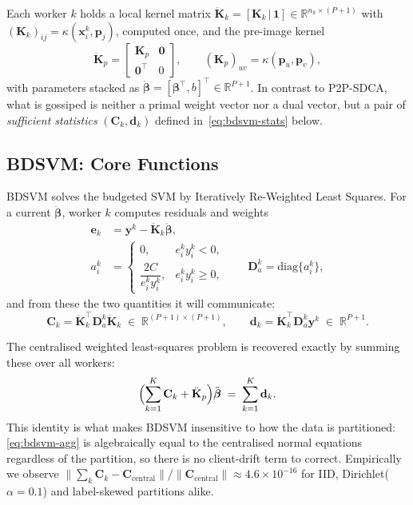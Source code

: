 Each worker $k$ holds a local kernel matrix
$\ddot{\mathbf{K}}_k = [\mathbf{K}_k \,|\, \mathbf{1}] \in \mathbb{R}^{n_k \times (P+1)}$
with $(\mathbf{K}_k)_{ij} = \kappa(\mathbf{x}^k_i, \mathbf{p}_j)$, computed once,
and the pre-image kernel
\begin{equation}
  \ddot{\mathbf{K}}_p =
  \begin{bmatrix} \mathbf{K}_p & \mathbf{0} \\ \mathbf{0}^{\!\top} & 0 \end{bmatrix},
  \qquad (\mathbf{K}_p)_{uv} = \kappa(\mathbf{p}_u, \mathbf{p}_v),
\end{equation}
with parameters stacked as
$\ddot{\boldsymbol{\beta}} = [\boldsymbol{\beta}^{\!\top}, b]^{\!\top} \in \mathbb{R}^{P+1}$.
In contrast to P2P-SDCA, what is gossiped is neither a primal weight vector nor
a dual vector, but a pair of \emph{sufficient statistics}
$(\mathbf{C}_k, \mathbf{d}_k)$ defined in~\eqref{eq:bdsvm-stats} below.

\subsection{BDSVM: Core Functions}

BDSVM solves the budgeted SVM by Iteratively Re-Weighted Least Squares. For a
current $\ddot{\boldsymbol{\beta}}$, worker $k$ computes residuals and weights
\begin{align}
  \mathbf{e}_k &= \mathbf{y}^k - \ddot{\mathbf{K}}_k \ddot{\boldsymbol{\beta}}, \\
  a^k_i &=
  \begin{cases}
    0, & e^k_i y^k_i < 0,\\[2pt]
    \dfrac{2C}{e^k_i y^k_i}, & e^k_i y^k_i \geq 0,
  \end{cases}
  \qquad \mathbf{D}^k_a = \mathrm{diag}\{a^k_i\},
\end{align}
and from these the two quantities it will communicate:
\begin{equation}
  \mathbf{C}_k = \ddot{\mathbf{K}}_k^{\!\top} \mathbf{D}^k_a \ddot{\mathbf{K}}_k
  \;\in\; \mathbb{R}^{(P+1)\times(P+1)},
  \qquad
  \mathbf{d}_k = \ddot{\mathbf{K}}_k^{\!\top} \mathbf{D}^k_a \mathbf{y}^k
  \;\in\; \mathbb{R}^{P+1}.
  \label{eq:bdsvm-stats}
\end{equation}

The centralised weighted least-squares problem is recovered exactly by summing
these over all workers:
\begin{equation}
  \Bigl( \sum_{k=1}^{K} \mathbf{C}_k + \ddot{\mathbf{K}}_p \Bigr)
  \ddot{\boldsymbol{\beta}} \;=\; \sum_{k=1}^{K} \mathbf{d}_k .
  \label{eq:bdsvm-agg}
\end{equation}
This identity is what makes BDSVM insensitive to how the data is partitioned:
\eqref{eq:bdsvm-agg} is algebraically equal to the centralised normal equations
regardless of the partition, so there is no client-drift term to correct.
Empirically we observe
$\|\sum_k \mathbf{C}_k - \mathbf{C}_{\text{central}}\| / \|\mathbf{C}_{\text{central}}\|
\approx 4.6\times 10^{-16}$ for IID, Dirichlet($\alpha{=}0.1$) and label-skewed
partitions alike.

